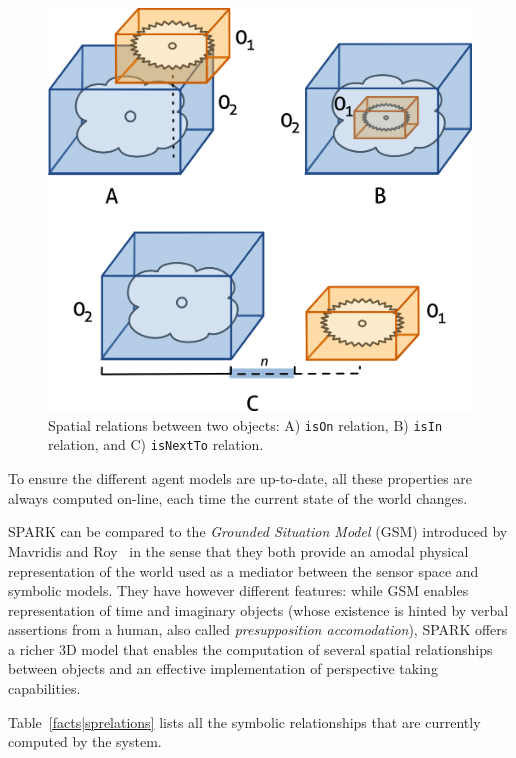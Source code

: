 \documentclass{svmult}
\newcommand{\concept}[1]{{\footnotesize \texttt{#1}}}
\begin{document}
\begin{itemize}
\begin{itemize}
\begin{figure} 
	\centering
	\includegraphics[width=0.6\columnwidth]{figs/spatial_relation.png}
	\caption{Spatial relations between two objects: A) \concept{isOn} relation, 
	B) \concept{isIn} relation, and C) \concept{isNextTo} relation.} 
	\label{fig::sprelation} 
\end{figure}

\end{itemize} 
\end{itemize}

To ensure the different agent models are up-to-date, all these properties are
always computed on-line, each time the current state of the world changes.

SPARK can be compared to the \emph{Grounded Situation Model} (GSM) introduced
by Mavridis and Roy~\cite{Mavridis2005} in the sense that they both provide an
amodal physical representation of the world used as a mediator between the
sensor space and symbolic models. They have however different features: while
GSM enables representation of time and imaginary objects (whose existence is
hinted by verbal assertions from a human, also called \emph{presupposition
accomodation}), SPARK offers a richer 3D model that enables the computation of
several spatial relationships between objects and an effective implementation
of perspective taking capabilities.

Table~\ref{facts|sprelations} lists all the symbolic relationships that are
currently computed by the system.
\end{document}
